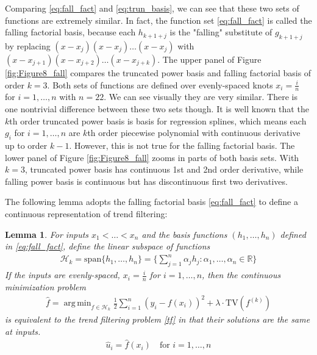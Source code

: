 \documentclass[a4paper]{article}
\DeclareMathOperator*{\argmin}{arg\,min}
\newtheorem{lemma}[theorem]{Lemma}
\newcommand{\RR}{\mathbb{R}}
\renewcommand{\cal}{\mathcal}
\begin{document}


Comparing \eqref{eq:fall_fact} and \eqref{eq:trun_basis}, we can see that these two sets of functions are extremely similar. In fact, the function set \eqref{eq:fall_fact} is called the falling factorial basis\cite{wang2014falling}, because each $h_{k+1+j}$ is the "falling" substitute of $g_{k+1+j}$ by replacing $(x-x_j)(x-x_j)\ldots(x-x_j)$ with $(x-x_{j+1})(x-x_{j+2})\ldots(x-x_{j+k})$. The upper panel of Figure \ref{fig:Figure8_fall} compares the truncated power basis and falling factorial basis of order $k = 3$. Both sets of functions are defined over evenly-spaced knots $x_i = \frac{i}{n}$ for $i= 1,\ldots, n$ with $n = 22$. We can see visually they are very similar. There is one nontrivial difference between these two sets though. It is well known that the $k$th order truncated power basis is basis for regression splines, which means each $g_i$ for $i=1,\ldots, n$ are $k$th order piecewise polynomial with continuous derivative up to order $k-1$. However, this is not true for the falling factorial basis. The lower panel of Figure \ref{fig:Figure8_fall} zooms in parts of both basis sets. With $k =3$, truncated power basis has continuous 1st and 2nd order derivative, while falling power basis is continuous but has discontinuous first two derivatives.

The following lemma adopts the falling factorial basis \eqref{eq:fall_fact} to define a continuous representation of trend filtering:
\begin{lemma}
For inputs $x_1<\ldots<x_n$ and the basis functions $(h_1,\ldots, h_n)$ defined in \eqref{eq:fall_fact}, define the linear subspace of functions
\begin{align}
\cal{H}_k = \text{span}\{h_1,\ldots, h_n\} = \Big\{\sum_{j=1}^n \alpha_jh_j:\alpha_1,\ldots, \alpha_n\in\RR\Big\}
\label{eq:linear_class}
\end{align}
If the inputs are evenly-spaced, $x_i=\frac{i}{n}$ for $i=1,\ldots, n$, then the continuous minimization problem
\begin{align}
\hat{f} = \argmin_{f\in\cal{H}_k} \frac{1}{2}\sum_{i=1}^n(y_i-f(x_i))^2 + \lambda\cdot\text{TV}(f^{(k)})
\end{align}
is equivalent to the trend filtering problem \eqref{tf} in that their solutions are the same at inputs.
\begin{align*}
\hat{u}_i = \hat{f}(x_i) \quad \text{for } i=1,\ldots,n  
\end{align*}
\label{lemma:cont}
\end{lemma}
\end{document}
